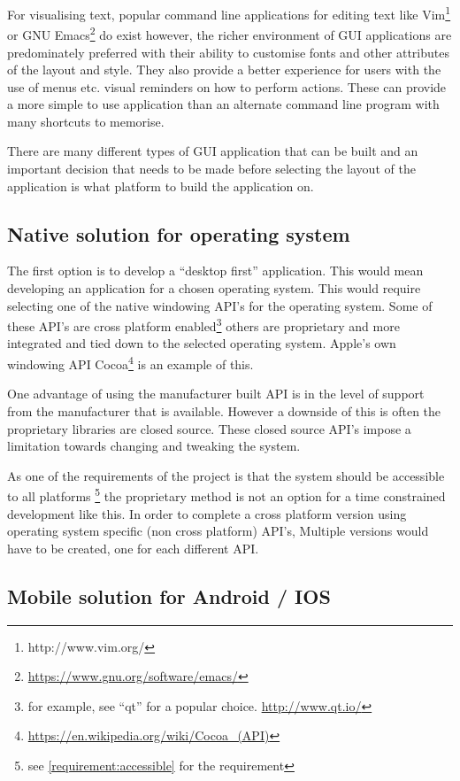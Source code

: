 For visualising text, popular command line applications for editing text like
Vim\footnote{http://www.vim.org/} or GNU
Emacs\footnote{\url{https://www.gnu.org/software/emacs/}} do exist however, the
richer environment of GUI applications are predominately preferred with their
ability to customise fonts and other attributes of the layout and style. They
also provide a better experience for users with the use of menus etc. visual
reminders on how to perform actions. These can provide a more simple to use
application than an alternate command line program with many shortcuts to
memorise.

There are many different types of GUI application that can be built and
an important decision that needs to be made before selecting the layout
of the application is what platform to build the application on.

\subsection{Native solution for operating
system}\label{native-solution-for-operating-system}

The first option is to develop a ``desktop first'' application. This would mean
developing an application for a chosen operating system. This would require
selecting one of the native windowing API's for the operating system. Some of
these API's are cross platform enabled\footnote{for example, see ``qt'' for a
popular choice. \url{http://www.qt.io/}} others are proprietary and more
integrated and tied down to the selected operating system. Apple's own windowing
API Cocoa\footnote{\url{https://en.wikipedia.org/wiki/Cocoa_(API)}} is an
example of this.

One advantage of using the manufacturer built API is in the level of support
from the manufacturer that is available. However a downside of this is often the
proprietary libraries are closed source. These closed source API's impose a
limitation towards changing and tweaking the system.

As one of the requirements of the project is that the system should be
accessible to all platforms \footnote{ see \ref{requirement:accessible} for the
requirement} the proprietary method is not an option for a time constrained
development like this. In order to complete a cross platform version using
operating system specific (non cross platform) API's, Multiple versions would
have to be created, one for each different API.

\subsection{Mobile solution for Android / IOS}%
\label{mobile-solution-for-android-ios}

